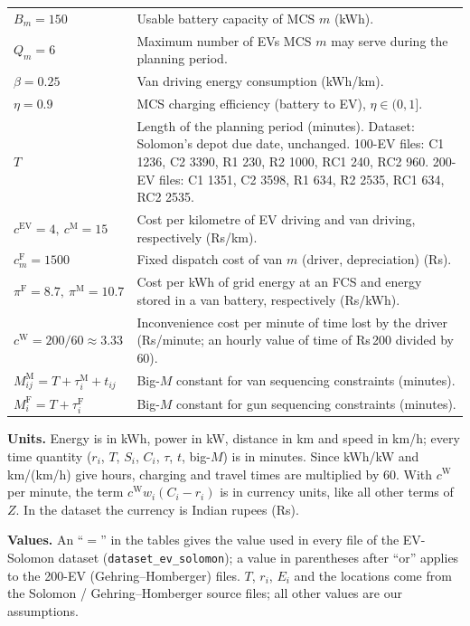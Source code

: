 \documentclass[12pt,a4paper]{article}
\begin{document}
{\begin{tabularx}{\textwidth}{@{}>{\raggedright\arraybackslash}p{4.6cm}X@{}}
$B_m=150$ & Usable battery capacity of MCS $m$ (kWh). \\[2pt]
$Q_m=6$ & Maximum number of EVs MCS $m$ may serve during the planning period. \\[2pt]
$\beta=0.25$ & Van driving energy consumption (kWh/km). \\[2pt]
$\eta=0.9$ & MCS charging efficiency (battery to EV), $\eta\in(0,1]$. \\[2pt]
$T$ & Length of the planning period (minutes). Dataset: Solomon's depot due date, unchanged. 100-EV files: C1 1236, C2 3390, R1 230, R2 1000, RC1 240, RC2 960. 200-EV files: C1 1351, C2 3598, R1 634, R2 2535, RC1 634, RC2 2535. \\[2pt]
$c^{\mathrm{EV}}=4,\ c^{\mathrm M}=15$ & Cost per kilometre of EV driving and van driving, respectively (Rs/km). \\[2pt]
$c^{\mathrm F}_m=1500$ & Fixed dispatch cost of van $m$ (driver, depreciation) (Rs). \\[2pt]
$\pi^{\mathrm F}=8.7,\ \pi^{\mathrm M}=10.7$ & Cost per kWh of grid energy at an FCS and energy stored in a van battery, respectively (Rs/kWh). \\[2pt]
$c^{\mathrm W}=200/60\approx3.33$ & Inconvenience cost per minute of time lost by the driver (Rs/minute; an hourly value of time of Rs\,200 divided by 60). \\[2pt]
$M^{\mathrm M}_{ij}=T+\tau^{\mathrm M}_i+t_{ij}$ & Big-$M$ constant for van sequencing constraints (minutes). \\[2pt]
$M^{\mathrm F}_i=T+\tau^{\mathrm F}_i$ & Big-$M$ constant for gun sequencing constraints (minutes). \\
\bottomrule
\end{tabularx}}

\textbf{Units.} Energy is in kWh, power in kW, distance in km and speed in km/h; every time quantity ($r_i$, $T$, $S_i$, $C_i$, $\tau$, $t$, big-$M$) is in minutes. Since kWh/kW and km/(km/h) give hours, charging and travel times are multiplied by 60. With $c^{\mathrm W}$ per minute, the term $c^{\mathrm W}w_i(C_i-r_i)$ is in currency units, like all other terms of $Z$. In the dataset the currency is Indian rupees (Rs).

\textbf{Values.} An ``$=$'' in the tables gives the value used in every file of the EV-Solomon dataset (\texttt{dataset\_ev\_solomon}); a value in parentheses after ``or'' applies to the 200-EV (Gehring--Homberger) files. $T$, $r_i$, $E_i$ and the locations come from the Solomon / Gehring--Homberger source files; all other values are our assumptions.
\end{document}
